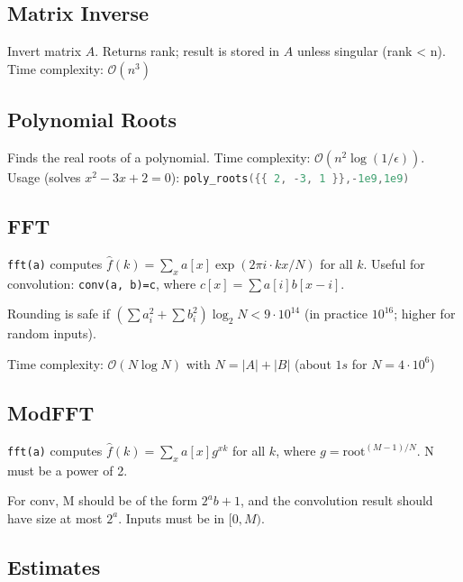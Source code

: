 \documentclass{article}
\begin{document}
\subsection*{Matrix Inverse}
Invert matrix $A$. Returns rank; result is stored in $A$ unless singular (rank < n). Time complexity: $\mathcal{O}(n^3)$


\subsection*{Polynomial Roots}
Finds the real roots of a polynomial. Time complexity: $\mathcal{O}(n^2 \log(1/\epsilon))$.\\
Usage (solves $x^2-3x+2 = 0$): \lstinline[language=cpp]|poly_roots({{ 2, -3, 1 }},-1e9,1e9)|


\vspace*{-0.3cm}

\subsection*{FFT}
\lstinline{fft(a)} computes $\hat f(k) = \sum_x a[x] \exp(2\pi i \cdot k x / N)$ for all $k$.
Useful for convolution: \lstinline{conv(a, b)=c}, where $c[x] = \sum a[i]b[x-i]$.

Rounding is safe if $(\sum a_i^2 + \sum b_i^2)\log_2{N} < 9\cdot10^{14}$
(in practice $10^{16}$; higher for random inputs).

Time complexity: $\mathcal{O}(N \log N)$ with $N = |A|+|B|$ (about $1s$ for $N=4 \cdot 10^6$)


\newpage

\subsection*{ModFFT}
\lstinline{fft(a)} computes $\hat f(k) = \sum_x a[x] g^{xk}$ for all $k$, where $g=\text{root}^{(M-1)/N}$. N must be a power of 2.

For conv, M should be of the form $2^a b+1$, and the convolution result should have size at most $2^a$. Inputs must be in $[0,M)$.




\subsection*{Estimates}
\end{document}
